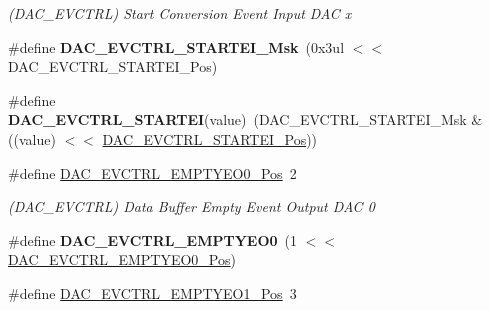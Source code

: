 \begin{DoxyCompactItemize}
\begin{DoxyCompactList}\small\item\em (D\+A\+C\+\_\+\+E\+V\+C\+T\+R\+L) Start Conversion Event Input D\+A\+C x \end{DoxyCompactList}\item 
\hypertarget{group___s_a_m_l21___d_a_c_ga6057a110d8ba07faa5c6ed70955b9ffd}{}\#define {\bfseries D\+A\+C\+\_\+\+E\+V\+C\+T\+R\+L\+\_\+\+S\+T\+A\+R\+T\+E\+I\+\_\+\+Msk}~(0x3ul $<$$<$ D\+A\+C\+\_\+\+E\+V\+C\+T\+R\+L\+\_\+\+S\+T\+A\+R\+T\+E\+I\+\_\+\+Pos)\label{group___s_a_m_l21___d_a_c_ga6057a110d8ba07faa5c6ed70955b9ffd}

\item 
\hypertarget{group___s_a_m_l21___d_a_c_ga6b512270a7756fc1b5a039928b5c9c27}{}\#define {\bfseries D\+A\+C\+\_\+\+E\+V\+C\+T\+R\+L\+\_\+\+S\+T\+A\+R\+T\+E\+I}(value)~(D\+A\+C\+\_\+\+E\+V\+C\+T\+R\+L\+\_\+\+S\+T\+A\+R\+T\+E\+I\+\_\+\+Msk \& ((value) $<$$<$ \hyperlink{group___s_a_m_l21___d_a_c_ga31ff6c0f7fef665224fcf1068cd3f3fd}{D\+A\+C\+\_\+\+E\+V\+C\+T\+R\+L\+\_\+\+S\+T\+A\+R\+T\+E\+I\+\_\+\+Pos}))\label{group___s_a_m_l21___d_a_c_ga6b512270a7756fc1b5a039928b5c9c27}

\item 
\hypertarget{group___s_a_m_l21___d_a_c_ga539b4b5ee23b56a9277d8d35786f1c3a}{}\#define \hyperlink{group___s_a_m_l21___d_a_c_ga539b4b5ee23b56a9277d8d35786f1c3a}{D\+A\+C\+\_\+\+E\+V\+C\+T\+R\+L\+\_\+\+E\+M\+P\+T\+Y\+E\+O0\+\_\+\+Pos}~2\label{group___s_a_m_l21___d_a_c_ga539b4b5ee23b56a9277d8d35786f1c3a}

\begin{DoxyCompactList}\small\item\em (D\+A\+C\+\_\+\+E\+V\+C\+T\+R\+L) Data Buffer Empty Event Output D\+A\+C 0 \end{DoxyCompactList}\item 
\hypertarget{group___s_a_m_l21___d_a_c_gaa3c612fe18d84e24264635af0c69b7a8}{}\#define {\bfseries D\+A\+C\+\_\+\+E\+V\+C\+T\+R\+L\+\_\+\+E\+M\+P\+T\+Y\+E\+O0}~(1 $<$$<$ \hyperlink{group___s_a_m_l21___d_a_c_ga539b4b5ee23b56a9277d8d35786f1c3a}{D\+A\+C\+\_\+\+E\+V\+C\+T\+R\+L\+\_\+\+E\+M\+P\+T\+Y\+E\+O0\+\_\+\+Pos})\label{group___s_a_m_l21___d_a_c_gaa3c612fe18d84e24264635af0c69b7a8}

\item 
\hypertarget{group___s_a_m_l21___d_a_c_gaa44f1da02c684b654a656fc7efc9dc62}{}\#define \hyperlink{group___s_a_m_l21___d_a_c_gaa44f1da02c684b654a656fc7efc9dc62}{D\+A\+C\+\_\+\+E\+V\+C\+T\+R\+L\+\_\+\+E\+M\+P\+T\+Y\+E\+O1\+\_\+\+Pos}~3\label{group___s_a_m_l21___d_a_c_gaa44f1da02c684b654a656fc7efc9dc62}


\end{DoxyCompactItemize}
